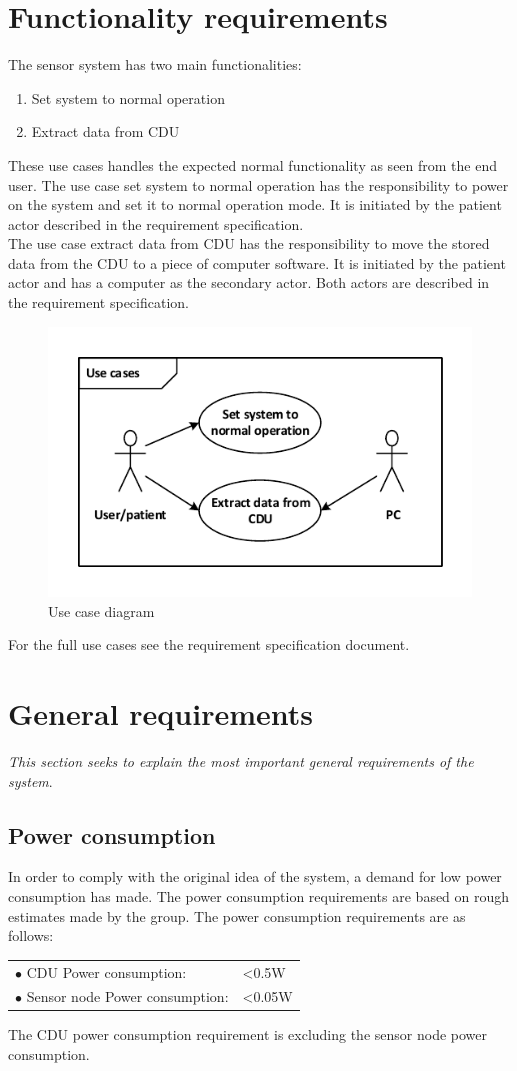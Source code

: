 \section{Functionality requirements}
The sensor system has two main functionalities:
\begin{enumerate}
	\item Set system to normal operation
	\item Extract data from CDU
\end{enumerate}
These use cases handles the expected normal functionality as seen from the end user. The use case set system to normal operation has the responsibility to power on the system and set it to normal operation mode. It is initiated by the patient actor described in the requirement specification.\\
The use case extract data from CDU has the responsibility to move the stored data from the CDU to a piece of computer software. It is initiated by the patient actor and has a computer as the secondary actor. Both actors are described in the requirement specification.
\begin{figure}[H]
	\centering
	\includegraphics[width=.7\textwidth]{billeder/7requirementspec/usecase_vector}
	\caption{Use case diagram}
\end{figure}
For the full use cases see the requirement specification document.
\section{General requirements}
\textit{This section seeks to explain the most important general requirements of the system}.
\subsection{Power consumption}
In order to comply with the original idea of the system, a demand for low power consumption has made. The power consumption requirements are based on rough estimates made by the group. The power consumption requirements are as follows:
\begin{table}[H]
	\begin{tabular}{p{8cm} p{2cm}}
	$\bullet$ CDU Power consumption: & <0.5W\\
	$\bullet$ Sensor node Power consumption: & <0.05W\\
	\end{tabular}
\end{table}
The CDU power consumption requirement is excluding the sensor node power consumption.
